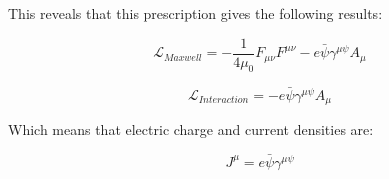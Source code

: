 \documentclass[a4]{article}
\begin{document}
    This reveals that this prescription gives the following results:

    \begin{equation}
        \mathcal{L}_{Maxwell} = - \frac{1}{4 \mu_{0}} F_{\mu \nu} F^{\mu \nu} - e \bar{\psi} \gamma^{\mu \psi} A_{\mu}
    \end{equation}

    \begin{equation}
        \mathcal{L}_{Interaction} = - e \bar{\psi} \gamma^{\mu \psi} A_{\mu}
    \end{equation}

    Which means that electric charge and current densities are:

    \begin{equation}
        J^{\mu} = e \bar{\psi} \gamma^{\mu \psi}
    \end{equation}
\end{document}
